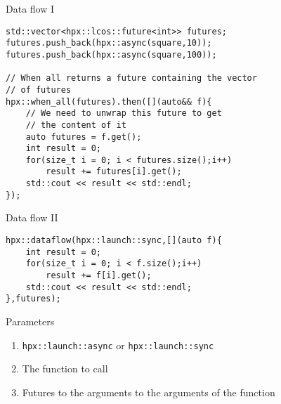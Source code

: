\documentclass[12pt,t]{beamer}
\begin{document}
\begin{frame}[fragile]{Data flow I}
\begin{lstlisting}
std::vector<hpx::lcos::future<int>> futures;
futures.push_back(hpx::async(square,10));
futures.push_back(hpx::async(square,100));

// When all returns a future containing the vector 
// of futures
hpx::when_all(futures).then([](auto&& f){
    // We need to unwrap this future to get 
    // the content of it
    auto futures = f.get();
    int result = 0;
    for(size_t i = 0; i < futures.size();i++)
        result += futures[i].get();
    std::cout << result << std::endl;
});
\end{lstlisting}
\end{frame}


\begin{frame}[fragile]{Data flow II}

\begin{lstlisting}
hpx::dataflow(hpx::launch::sync,[](auto f){
    int result = 0;
    for(size_t i = 0; i < f.size();i++)
        result += f[i].get();
    std::cout << result << std::endl;
},futures);
\end{lstlisting}

\begin{block}{Parameters}
\begin{enumerate}
\item \lstinline|hpx::launch::async| or \lstinline|hpx::launch::sync|
\item The function to call
\item Futures to the arguments to the arguments of the function
\end{enumerate}
\end{block}


\end{frame}
\end{document}
